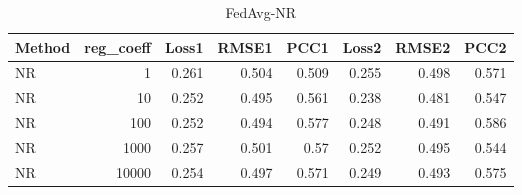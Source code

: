 \begin{table}
\caption{FedAvg-NR}
\begin{tabular}{lrrrrrrr}
\toprule
Method & reg_coeff & Loss1 & RMSE1 & PCC1 & Loss2 & RMSE2 & PCC2 \\
\midrule
NR & 1 & 0.261 & 0.504 & 0.509 & 0.255 & 0.498 & 0.571 \\
NR & 10 & 0.252 & 0.495 & 0.561 & 0.238 & 0.481 & 0.547 \\
NR & 100 & 0.252 & 0.494 & 0.577 & 0.248 & 0.491 & 0.586 \\
NR & 1000 & 0.257 & 0.501 & 0.57 & 0.252 & 0.495 & 0.544 \\
NR & 10000 & 0.254 & 0.497 & 0.571 & 0.249 & 0.493 & 0.575 \\
\bottomrule
\end{tabular}
\end{table}
